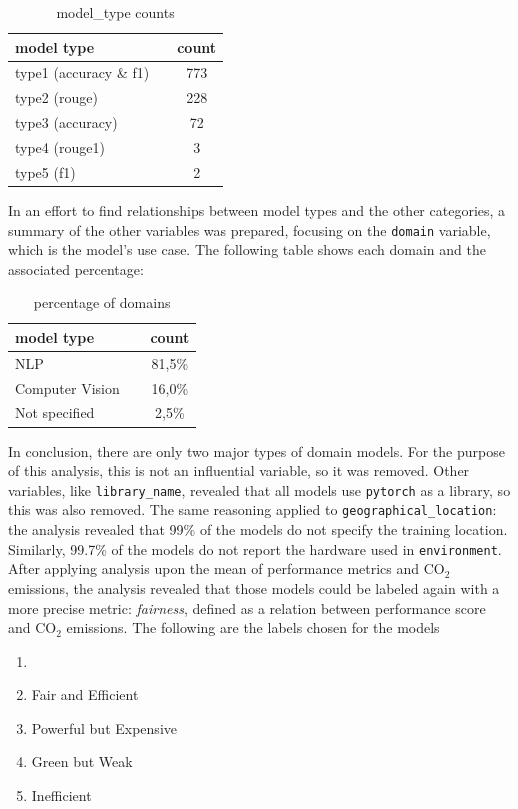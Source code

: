 \documentclass[journal]{IEEEtran}
\begin{document}
	 \begin{table}[H]
	 	\centering
	 	\caption{model\_type counts}
	 	\begin{tabular}{l c }
	 		\toprule
	 		model type & count \\
	 		\midrule
	 		type1 (accuracy \& f1)  & 773 \\
	 		type2 (rouge)           & 228 \\
	 		type3 (accuracy)        & 72 \\
	 		type4 (rouge1)          & 3 \\
	 		type5 (f1)   			& 2 \\
	 		\bottomrule
	 	\end{tabular}
	 	\label{tab:model_type_counts}
	 \end{table}

	 In an effort to find relationships between model types and the other categories, a summary of the other variables was prepared, focusing on the \texttt{domain} variable, which is the model's use case. The following table shows each domain and the associated percentage:
	 \begin{table}[H]
	 	\centering
	 	\caption{percentage of domains}
	 	\begin{tabular}{l c }
	 		\toprule
	 		model type & count \\
	 		\midrule
	 		NLP  & 81,5\% \\
	 		Computer Vision & 16,0\% \\
	 		Not specified        & 2,5\% \\
	 		\bottomrule
	 	\end{tabular}
	 	\label{tab:domain_percentage}
	 \end{table}
	 In conclusion, there are only two major types of domain models. For the purpose of this analysis, this is not an influential variable, so it was removed.
	 Other variables, like \texttt{library\_name}, revealed that all models use \texttt{pytorch} as a library, so this was also removed. The same reasoning applied to \texttt{geographical\_location}: the analysis revealed that 99\% of the models do not specify the training location. Similarly, 99.7\% of the models do not report the hardware used in \texttt{environment}.
	 After applying analysis upon the mean of performance metrics and $\text{CO}_2$ emissions, the analysis revealed that those models could be labeled again with a more precise metric: \textit{fairness}, defined as a relation between performance score and $\text{CO}_2$ emissions. The following are the labels chosen for the models
	 \begin{enumerate}
	 	\item[]\hspace{-\labelwidth}\hspace{-\labelsep}
	 	\item Fair and Efficient
	 	\item Powerful but Expensive
	 	\item Green but Weak
	 	\item Inefficient
	 \end{enumerate}
\end{document}
